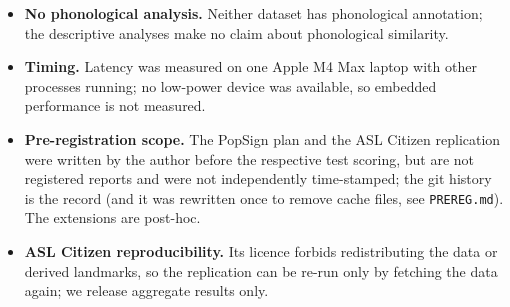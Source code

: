 \begin{itemize}
evaluate any system with Deaf users.
\item \textbf{No phonological analysis.} Neither dataset has phonological annotation; the descriptive analyses make no claim about phonological similarity.
\item \textbf{Timing.} Latency was measured on one Apple M4 Max laptop with other processes running; no low-power device was
available, so embedded performance is not measured.
\item \textbf{Pre-registration scope.} The PopSign plan and the ASL Citizen replication were written by the author before the respective test scoring, but are not registered reports and
were not independently time-stamped; the git history is the record (and it was rewritten once to remove cache files, see \texttt{PREREG.md}). The extensions are post-hoc.
\item \textbf{ASL Citizen reproducibility.} Its licence forbids redistributing the data or derived landmarks, so the replication can be re-run only by fetching the data again; we release aggregate results only.
\end{itemize}
